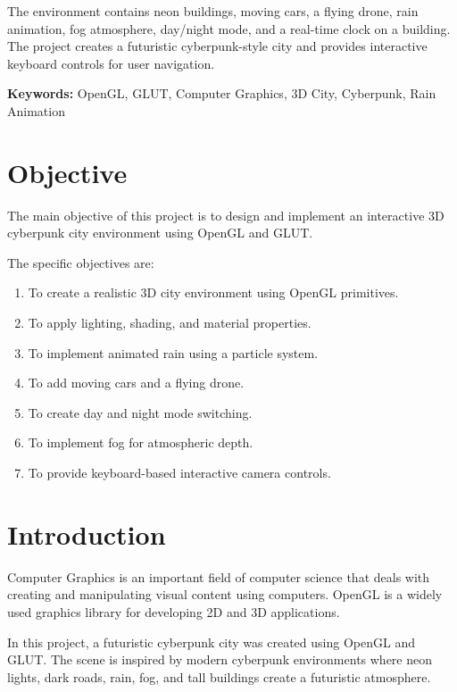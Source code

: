 \documentclass[12pt,a4paper]{report}
\begin{document}
The environment contains neon buildings, moving cars, a flying drone, rain animation, fog atmosphere, day/night mode, and a real-time clock on a building. The project creates a futuristic cyberpunk-style city and provides interactive keyboard controls for user navigation.

\textbf{Keywords:} OpenGL, GLUT, Computer Graphics, 3D City, Cyberpunk, Rain Animation

\newpage

\chapter{Objective}

The main objective of this project is to design and implement an interactive 3D cyberpunk city environment using OpenGL and GLUT.

The specific objectives are:

\begin{enumerate}
    \item To create a realistic 3D city environment using OpenGL primitives.
    \item To apply lighting, shading, and material properties.
    \item To implement animated rain using a particle system.
    \item To add moving cars and a flying drone.
    \item To create day and night mode switching.
    \item To implement fog for atmospheric depth.
    \item To provide keyboard-based interactive camera controls.
\end{enumerate}

\chapter{Introduction}

Computer Graphics is an important field of computer science that deals with creating and manipulating visual content using computers. OpenGL is a widely used graphics library for developing 2D and 3D applications.

In this project, a futuristic cyberpunk city was created using OpenGL and GLUT. The scene is inspired by modern cyberpunk environments where neon lights, dark roads, rain, fog, and tall buildings create a futuristic atmosphere.
\end{document}
